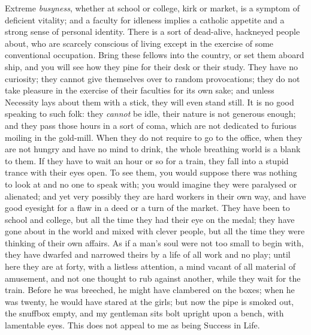 Extreme \textit{busyness}, whether at school or college, kirk or
market, is a symptom of deficient vitality; and a faculty for idleness
implies a catholic appetite and a strong sense of personal identity.
There is a sort of dead-alive, hackneyed people about, who 
are scarcely conscious of living except in the exercise of some
conventional occupation. Bring these fellows into the country, or set
them aboard ship, and you will see how they pine for their desk or
their study. They have no curiosity; they cannot give themselves over
to random provocations; they do not take pleasure in the exercise of
their faculties for its own sake; and unless Necessity lays about them
with a stick, they will even stand still. It is no good speaking to
such folk: they \textit{cannot} be idle, their nature is not generous
enough; and they pass those hours in a sort of coma, which are not
dedicated to furious moiling in the gold-mill. When they do not
require to go to the office, when they are not hungry and have no mind
to drink, the whole breathing world is a blank to them. If they have
to wait an hour or so for a train, they fall into a stupid trance with
their eyes open. To see them, you would suppose there was nothing to
look at and no one to speak with; you would imagine  they
were paralysed or alienated; and yet very possibly they are hard
workers in their own way, and have good eyesight for a flaw in a deed
or a turn of the market. They have been to school and college, but all
the time they had their eye on the medal; they have gone about in the
world and mixed with clever people, but all the time they were
thinking of their own affairs. As if a man's soul were not too small
to begin with, they have dwarfed and narrowed theirs by a life of all
work and no play; until here they are at forty, with a listless
attention, a mind vacant of all material of amusement, and not one
thought to rub against another, while they wait for the train. Before
he was breeched, he might have clambered on the boxes; when he was
twenty, he would have stared at the girls; but now the pipe is smoked
out, the snuffbox empty, and my gentleman sits bolt upright upon a
bench, with lamentable eyes. This does not appeal to me as being
Success in Life.

